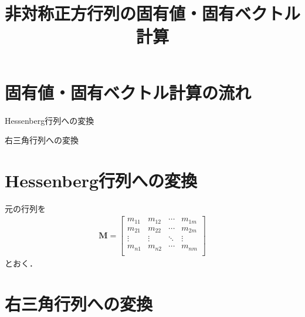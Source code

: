 ﻿\documentclass[a4paper]{jsarticle}
\title{非対称正方行列の固有値・固有ベクトル計算}
\begin{document}
\maketitle

\section{固有値・固有ベクトル計算の流れ}

Hessenberg行列への変換

右三角行列への変換

\section{Hessenberg行列への変換}


元の行列を
\begin{align*}
\bm{M}=\begin{bmatrix}
m_{11} & m_{12} & \cdots & m_{1m} \\
m_{21} & m_{22} & \cdots & m_{2m} \\
\vdots & \vdots & \ddots & \vdots \\
m_{n1} & m_{n2} & \cdots & m_{nm} \\
\end{bmatrix}
\end{align*}
とおく．



\section{右三角行列への変換}
\end{document}

